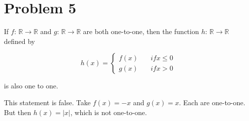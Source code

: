 \documentclass{article}
\begin{document}
\section*{Problem 5}

If $f$: $\mathbb{R} \rightarrow \mathbb{R}$ and $g$: $\mathbb{R} \rightarrow \mathbb{R}$ are both one-to-one, then the function $h$: $\mathbb{R} \rightarrow \mathbb{R}$ defined by 

\begin{equation*}
  h(x) = \left\{
  \begin{array}{ll}
    f(x) &\quad if x \le 0 \\
    g(x) &\quad if x > 0
  \end{array}
\right.
\end{equation*}

is also one to one. 

This statement is false. Take $f(x) = -x$ and $g(x) = x$. Each are one-to-one. But then $h(x) = |x|$, which is not one-to-one.
\end{document}
